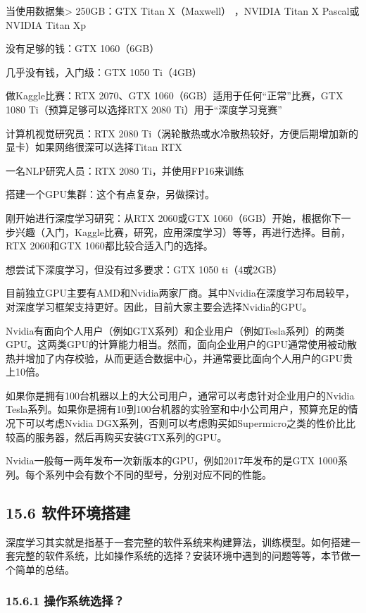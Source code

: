 当使用数据集\textgreater{} 250GB：GTX Titan X（Maxwell） ，NVIDIA Titan
X Pascal或NVIDIA Titan Xp

没有足够的钱：GTX 1060（6GB）

几乎没有钱，入门级：GTX 1050 Ti（4GB）

做Kaggle比赛：RTX 2070、GTX 1060（6GB）适用于任何``正常''比赛，GTX 1080
Ti（预算足够可以选择RTX 2080 Ti）用于``深度学习竞赛''

计算机视觉研究员：RTX 2080
Ti（涡轮散热或水冷散热较好，方便后期增加新的显卡）如果网络很深可以选择Titan
RTX

一名NLP研究人员：RTX 2080 Ti，并使用FP16来训练

搭建一个GPU集群：这个有点复杂，另做探讨。

刚开始进行深度学习研究：从RTX 2060或GTX
1060（6GB）开始，根据你下一步兴趣（入门，Kaggle比赛，研究，应用深度学习）等等，再进行选择。目前，RTX
2060和GTX 1060都比较合适入门的选择。

想尝试下深度学习，但没有过多要求：GTX 1050 ti（4或2GB）

目前独立GPU主要有AMD和Nvidia两家厂商。其中Nvidia在深度学习布局较早，对深度学习框架支持更好。因此，目前大家主要会选择Nvidia的GPU。

Nvidia有面向个人用户（例如GTX系列）和企业用户（例如Tesla系列）的两类GPU。这两类GPU的计算能力相当。然而，面向企业用户的GPU通常使用被动散热并增加了内存校验，从而更适合数据中心，并通常要比面向个人用户的GPU贵上10倍。

如果你是拥有100台机器以上的大公司用户，通常可以考虑针对企业用户的Nvidia
Tesla系列。如果你是拥有10到100台机器的实验室和中小公司用户，预算充足的情况下可以考虑Nvidia
DGX系列，否则可以考虑购买如Supermicro之类的性价比比较高的服务器，然后再购买安装GTX系列的GPU。

Nvidia一般每一两年发布一次新版本的GPU，例如2017年发布的是GTX
1000系列。每个系列中会有数个不同的型号，分别对应不同的性能。

\subsection{15.6
软件环境搭建}\label{ux8f6fux4ef6ux73afux5883ux642dux5efa}

深度学习其实就是指基于一套完整的软件系统来构建算法，训练模型。如何搭建一套完整的软件系统，比如操作系统的选择？安装环境中遇到的问题等等，本节做一个简单的总结。

\subsubsection{15.6.1
操作系统选择？}\label{ux64cdux4f5cux7cfbux7edfux9009ux62e9}

